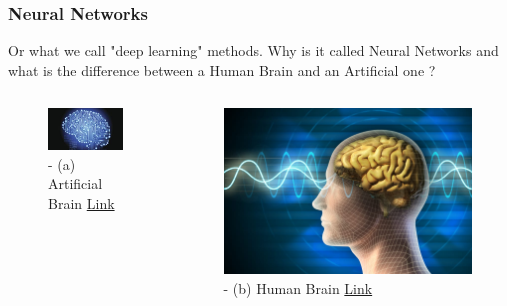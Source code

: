 \documentclass{beamer}
\begin{document}
\begin{frame}
\frametitle{Neural Networks}
Or what we call "deep learning" methods.
Why is it called Neural Networks and what is the difference between a Human Brain and an Artificial one ?
\begin{columns}
\centering
\begin{figure}
\includegraphics[scale=0.55]{artificial_brain.jpeg}
\caption{ - (a) Artificial Brain \textcolor{blue}{\href{https://www.thedailybeast.com/the-science-communitys-fight-over-an-artificial-brain}{Link}}}
\end{figure}
\centering
\begin{figure}
\includegraphics[scale=0.14]{humain_brain.jpg}
\caption{ - (b) Human Brain \textcolor{blue}{\href{https://www.pymnts.com/innovation/2019/elon-musk-human-brain-connected-device/}{Link}}}
\end{figure}
\end{columns}
\end{frame}
\end{document}
